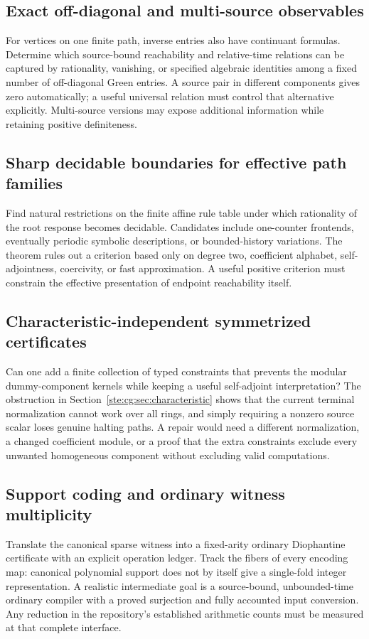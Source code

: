 \documentclass[11pt,letterpaper]{article}
\theoremstyle{definition}
\theoremstyle{remark}
\begin{document}
\subsection{Exact off-diagonal and multi-source observables}\label{ste:cg:q:offdiagonal}
For vertices on one finite path, inverse entries also have continuant
formulas. Determine which source-bound reachability and relative-time
relations can be captured by rationality, vanishing, or specified algebraic
identities among a fixed number of off-diagonal Green entries. A source
pair in different components gives zero automatically; a useful universal
relation must control that alternative explicitly. Multi-source versions
may expose additional information while retaining positive definiteness.

\subsection{Sharp decidable boundaries for effective path families}\label{ste:cg:q:decidable}
Find natural restrictions on the finite affine rule table under which
rationality of the root response becomes decidable. Candidates include
one-counter frontends, eventually periodic symbolic descriptions, or
bounded-history variations. The theorem rules out a criterion based only
on degree two, coefficient alphabet, self-adjointness, coercivity, or fast
approximation. A useful positive criterion must constrain the effective
presentation of endpoint reachability itself.

\subsection{Characteristic-independent symmetrized certificates}\label{ste:cg:q:characteristic}
Can one add a finite collection of typed constraints that prevents the
modular dummy-component kernels while keeping a useful self-adjoint
interpretation? The obstruction in Section~\ref{ste:cg:sec:characteristic} shows
that the current terminal normalization cannot work over all rings, and
simply requiring a nonzero source scalar loses genuine halting paths.
A repair would need a different normalization, a changed coefficient
module, or a proof that the extra constraints exclude every unwanted
homogeneous component without excluding valid computations.

\subsection{Support coding and ordinary witness multiplicity}\label{ste:cg:q:coding}
Translate the canonical sparse witness into a fixed-arity ordinary
Diophantine certificate with an explicit operation ledger. Track the
fibers of every encoding map: canonical polynomial support does not by
itself give a single-fold integer representation. A realistic intermediate
goal is a source-bound, unbounded-time ordinary compiler with a proved
surjection and fully accounted input conversion. Any reduction in the
repository's established arithmetic counts must be measured at that
complete interface.
\end{document}
